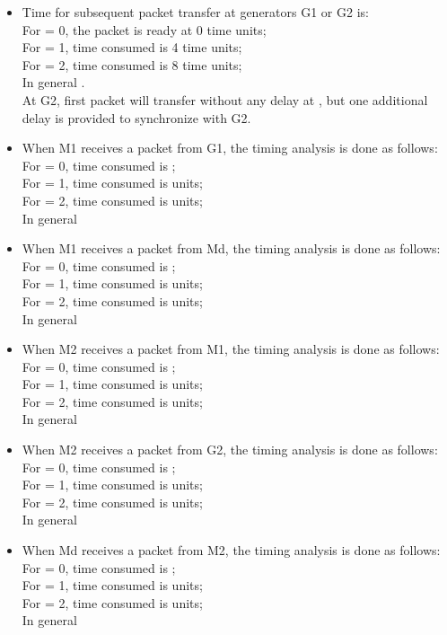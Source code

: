 \documentclass[letterpaper]{article}
\begin{document}
\begin{itemize}
	\item Time for subsequent packet transfer at generators G1 or G2 is:\\ For  = 0, the packet is ready at 0 time units;
\\ For  = 1, time consumed is 4 time units;
\\ For  = 2, time consumed is 8 time units;
\\ In general .\\

At G2, first packet will transfer without any delay at , but one additional delay is provided to synchronize with G2. 

\item When M1 receives a packet from G1, the timing analysis is done as follows:
\\ For  = 0, time consumed is  ;
\\For  = 1, time consumed is  units;
\\For  = 2, time consumed is  units;
\\ In general  

\item When M1 receives a packet from Md, the timing analysis is done as follows:
\\ For  = 0, time consumed is  ;
\\For  = 1, time consumed is  units;
\\For  = 2, time consumed is  units;
\\ In general  

\item When M2 receives a packet from M1, the timing analysis is done as follows:
\\ For  = 0, time consumed is  ;
\\For  = 1, time consumed is  units;
\\For  = 2, time consumed is  units;
\\ In general  

\item When M2 receives a packet from G2, the timing analysis is done as follows:
\\ For  = 0, time consumed is  ;
\\For  = 1, time consumed is  units;
\\For  = 2, time consumed is  units;
\\ In general  

\item When Md receives a packet from M2, the timing analysis is done as follows:
\\ For  = 0, time consumed is  ;
\\For  = 1, time consumed is  units;
\\For  = 2, time consumed is  units;
\\ In general  


\end{itemize}
\end{document}
